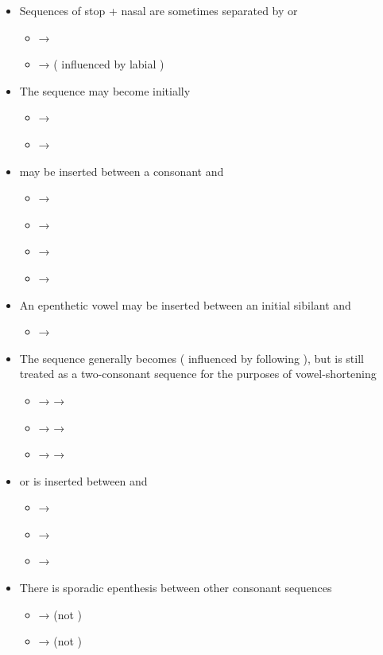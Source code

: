 \begin{itemize}
	\item Sequences of stop + nasal are sometimes separated by  or 
		\begin{itemize}
			\item {} → 
			\item {} →  ( influenced by labial )
		\end{itemize}
	\item The sequence  may become  initially
		\begin{itemize}
			\item {} → 
			\item {} → 
		\end{itemize}
	\item {} may be inserted between a consonant and 
		\begin{itemize}
			\item {} → 
			\item {} → 
			\item {} → 
			\item {} → 
		\end{itemize}
	\item An epenthetic vowel may be inserted between an initial sibilant and 
		\begin{itemize}
			\item {} → 
		\end{itemize}
	\item The sequence  generally becomes  ( influenced by following ), but is still treated as a two-consonant sequence for the purposes of vowel-shortening
		\begin{itemize}
			\item {} →  → 
			\item {} →  → 
			\item {} →  → 
		\end{itemize}
	\item {} or  is inserted between  and 
		\begin{itemize}
			\item {} → 
			\item {} → 
			\item {} → 
		\end{itemize}
	\item There is sporadic epenthesis between other consonant sequences
		\begin{itemize}
			\item {} →  (not )
			\item {} →  (not )
		\end{itemize}
\end{itemize}

